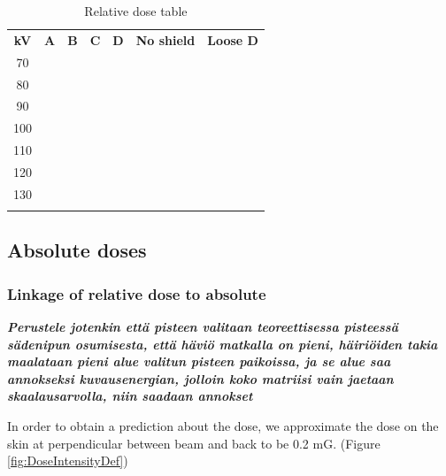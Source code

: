 \documentclass[fleqn,10pt]{SelfArx} %
\begin{document}
\begin{table}[!hbt]
	\caption{Relative dose table}
	\centering
	
	\label{tab:DoseCalculationCoefficient}
	\begin{tabulary}{\linewidth}[hbt]{||c|c|c|c|c|c|c||}
		\textbf{kV} & \textbf{A} & \textbf{B} & \textbf{C} & \textbf{D} & \textbf{No shield} & \textbf{Loose D}\\
		\hhline{|:=|=|=|=|=|=|=:|}
		70 &  &  &  &  &  &  \\
		\hhline{||-------||}
		80 &  &  &  &  &  &  \\
		\hhline{||-------||}
		90 &  &  &  &  &  &  \\
		\hhline{||-------||}
		100 &  &  &  &  &  &  \\
		\hhline{||-------||}
		110 &  &  &  &  &  &  \\
		\hhline{||-------||}
		120 &  &  &  &  &  &  \\
		\hhline{||-------||}
		130 &  &  &  &  &  &  \\
		
		
	\end{tabulary}
\end{table}


\subsection{Absolute doses}

\subsubsection{Linkage of relative dose to absolute}

\textbf{\textit{Perustele jotenkin että pisteen valitaan teoreettisessa pisteessä sädenipun osumisesta, että häviö matkalla on pieni, häiriöiden takia maalataan pieni alue valitun pisteen paikoissa, ja se alue saa annokseksi kuvausenergian, jolloin koko matriisi vain jaetaan skaalausarvolla, niin saadaan annokset}}

In order to obtain a prediction about the dose, we approximate the dose on the skin at perpendicular between beam and back to be 0.2 mG. (Figure \ref{fig:DoseIntensityDef}) 
\end{document}
